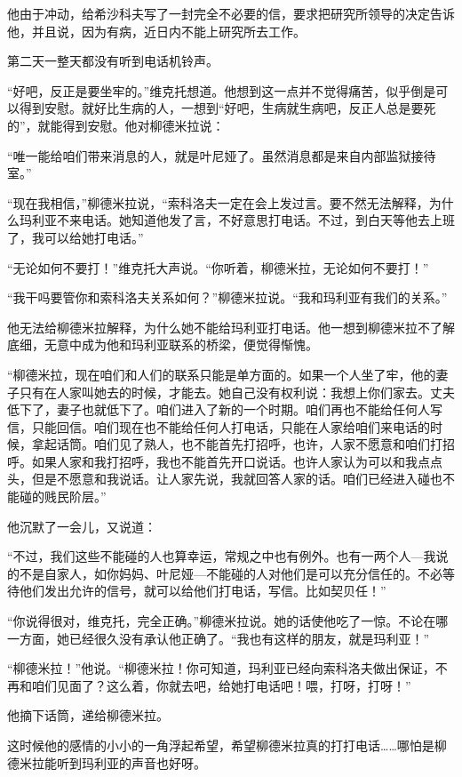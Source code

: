 他由于冲动，给希沙科夫写了一封完全不必要的信，要求把研究所领导的决定告诉他，并且说，因为有病，近日内不能上研究所去工作。

第二天一整天都没有听到电话机铃声。

“好吧，反正是要坐牢的。”维克托想道。他想到这一点并不觉得痛苦，似乎倒是可以得到安慰。就好比生病的人，一想到“好吧，生病就生病吧，反正人总是要死的”，就能得到安慰。他对柳德米拉说：

“唯一能给咱们带来消息的人，就是叶尼娅了。虽然消息都是来自内部监狱接待室。”

“现在我相信，”柳德米拉说，“索科洛夫一定在会上发过言。要不然无法解释，为什么玛利亚不来电话。她知道他发了言，不好意思打电话。不过，到白天等他去上班了，我可以给她打电话。”

“无论如何不要打！”维克托大声说。“你听着，柳德米拉，无论如何不要打！”

“我干吗要管你和索科洛夫关系如何？”柳德米拉说。“我和玛利亚有我们的关系。”

他无法给柳德米拉解释，为什么她不能给玛利亚打电话。他一想到柳德米拉不了解底细，无意中成为他和玛利亚联系的桥梁，便觉得惭愧。

“柳德米拉，现在咱们和人们的联系只能是单方面的。如果一个人坐了牢，他的妻子只有在人家叫她去的时候，才能去。她自己没有权利说：我想上你们家去。丈夫低下了，妻子也就低下了。咱们进入了新的一个时期。咱们再也不能给任何人写信，只能回信。咱们现在也不能给任何人打电话，只能在人家给咱们来电话的时候，拿起话筒。咱们见了熟人，也不能首先打招呼，也许，人家不愿意和咱们打招呼。如果人家和我打招呼，我也不能首先开口说话。也许人家认为可以和我点点头，但是不愿意和我说话。让人家先说，我就回答人家的话。咱们已经进入碰也不能碰的贱民阶层。”

他沉默了一会儿，又说道：

“不过，我们这些不能碰的人也算幸运，常规之中也有例外。也有一两个人—我说的不是自家人，如你妈妈、叶尼娅—不能碰的人对他们是可以充分信任的。不必等待他们发出允许的信号，就可以给他们打电话，写信。比如契贝任！”

“你说得很对，维克托，完全正确。”柳德米拉说。她的话使他吃了一惊。不论在哪一方面，她已经很久没有承认他正确了。“我也有这样的朋友，就是玛利亚！”

“柳德米拉！”他说。“柳德米拉！你可知道，玛利亚已经向索科洛夫做出保证，不再和咱们见面了？这么着，你就去吧，给她打电话吧！喂，打呀，打呀！”

他摘下话筒，递给柳德米拉。

这时候他的感情的小小的一角浮起希望，希望柳德米拉真的打打电话……哪怕是柳德米拉能听到玛利亚的声音也好呀。

